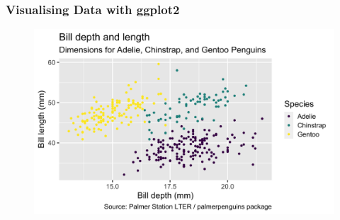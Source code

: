 \documentclass[11pt]{beamer}
\begin{document}
		
	\begin{frame}
		
		\frametitle{\textbf{Visualising Data with ggplot2}}

		\begin{figure}
			\centering
			\includegraphics[width=.8\linewidth]{Images/S2/penguins-10-nohighlight-1}
			
		\end{figure}
\
		
	\end{frame}

	
\end{document}
